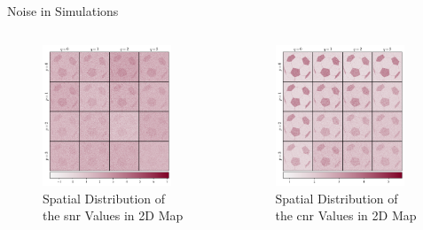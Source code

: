 \documentclass{beamer}
\begin{document}
\begin{frame}{Noise in Simulations}
\begin{columns}
\begin{figure}
\centering
\includegraphics[width=0.9\textwidth]{images/snr2D_Spatial.png}
\caption{Spatial Distribution of the \gls{snr} Values in 2D Map}
\end{figure}

\begin{figure}
\centering
\includegraphics[width=0.9\textwidth]{images/cnr2D_Spatial.png}
\caption{Spatial Distribution of the \gls{cnr} Values in 2D Map}
\end{figure}
\end{columns}
\end{frame}
\end{document}
